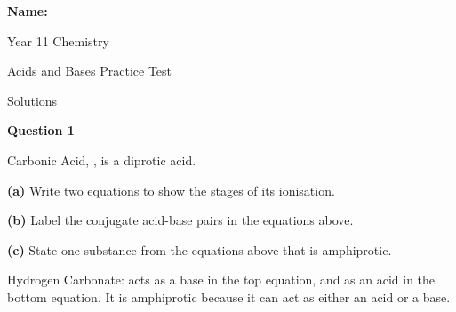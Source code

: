 \documentclass{article}
\begin{document}


{\Large \textbf{Name:}} \hspace{3cm} \vspace{1cm}


\begin{center}
{\Huge Year 11 Chemistry}
\end{center}

\begin{center}
{\huge Acids and Bases Practice Test}
\end{center}

\begin{center}
{\huge {\color{red} Solutions}}
\end{center}


{\Large

\vspace{0.2cm}
\hspace{1cm}
\textbf{Question 1} 
\vspace{0.2cm}

Carbonic Acid, , is a diprotic acid.
\vspace{0.2cm}

\textbf{(a)} Write two equations to show the stages of its ionisation.

{\color{red}
\begin{center}
\end{center}
}

\textbf{(b)} Label the conjugate acid-base pairs in the equations above.
\vspace{0.2cm}

\textbf{(c)} State one substance from the equations above that is amphiprotic.
\vspace{0.2cm}

{\color{red}
Hydrogen Carbonate:  acts as a base in the top equation, and as an acid in the bottom equation. It is amphiprotic because it can act as either an acid or a base.
}
\vspace{0.2cm}

}
\end{document}
